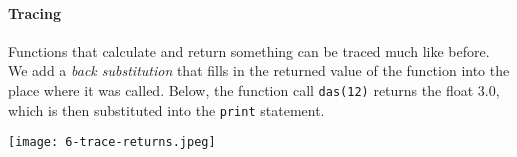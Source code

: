 %
%
%

%

\paragraph{Tracing}

Functions that calculate and return something can be traced much like before. We add a \emph{back substitution} that fills in the returned value of the function into the place where it was called. Below, the function call \texttt{das(12)} returns the float 3.0, which is then substituted into the \texttt{print} statement.

\texttt{[image: 6-trace-returns.jpeg]}

